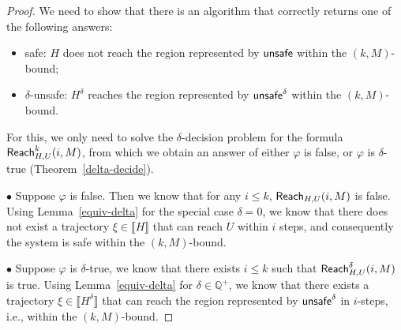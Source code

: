\documentclass[12pt]{article}
\begin{document}
\begin{proof}
We need to show that there is an algorithm that correctly returns one of the following answers:
\begin{itemize}
\item {\sf safe:} $H$ does not reach the region represented by $\mathsf{unsafe}$ within the $(k,M)$-bound;
\item {\sf $\delta$-unsafe:} $H^{\delta}$ reaches the region represented by $\mathsf{unsafe}^{\delta}$ within the $(k,M)$-bound.
\end{itemize}
For this, we only need to solve the $\delta$-decision problem for the formula $\mathsf{Reach}^k_{H,U}(i,M)$, from which we obtain an answer of either $\varphi$ is false, or $\varphi$ is $\delta$-true (Theorem~\ref{delta-decide}).

$\bullet$ Suppose $\varphi$ is false. Then we know that for any $i\leq k$, $\mathsf{Reach}_{H,U}(i,M)$ is false. Using Lemma~\ref{equiv-delta} for the special case $\delta=0$, we know that there does not exist a trajectory $\xi\in\llbracket H\rrbracket$ that can reach $U$ within $i$ steps, and consequently the system is safe within the $(k,M)$-bound.

$\bullet$ Suppose $\varphi$ is $\delta$-true, we know that there exists $i\leq k$ such that $\mathsf{Reach}^{\delta}_{H,U}(i,M)$ is true. Using Lemma~\ref{equiv-delta} for $\delta\in\mathbb{Q}^+$, we know that there exists a trajectory $\xi\in\llbracket H^{\delta}\rrbracket$ that can reach the region represented by $\mathsf{unsafe}^{\delta}$ in $i$-steps, i.e., within the $(k,M)$-bound.
\end{proof}
\end{document}

